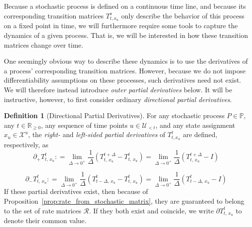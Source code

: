 \documentclass[10pt,a4paper]{paper}
\theoremstyle{definition}
\newtheorem{definition}{Definition}
\newcommand{\reals}{\mathbb{R}}
\newcommand{\realsnonneg}{\reals_{\geq 0}}
\newcommand{\states}{\mathcal{X}}
\newcommand{\processes}{\mathbb{P}}
\newcommand{\coloneqq}{:\!=}
\begin{document}
Because a stochastic process is defined on a continuous time line, and because its corresponding transition matrices $T_{t,x_u}^s$ only describe the behavior of this process on a fixed point in time, we will furthermore require some tools to capture the dynamics of a given process. That is, we will be interested in how these transition matrices change over time.

One seemingly obvious way to describe these dynamics is to use the derivatives of a process' corresponding transition matrices. However, because we do not impose differentiability assumptions on these processes, such derivatives need not exist. We will therefore instead introduce \emph{outer partial derivatives} below. It will be instructive, however, to first consider ordinary \emph{directional partial derivatives}.


\begin{definition}[Directional Partial Derivatives]\label{def:direc_partial_deriv}
For any stochastic process $P\in\processes$, any $t\in\realsnonneg$, any sequence of time points $u\in\mathcal{U}_{<t}$, and any state assignment $x_u\in\states^u$, the \emph{right-} and \emph{left-sided partial derivatives} of $T_{t,x_u}^t$ are defined, respectively, as
\begin{equation*}
\partial_{+}{T_{t,\,x_u}^t}
\coloneqq
\lim_{\Delta\to 0^{+}}
\frac{1}{\Delta}
(T^{t+\Delta}_{t,\,x_u}-T^t_{t,\,x_u})
=
\lim_{\Delta\to 0^{+}}
\frac{1}{\Delta}
(T^{t+\Delta}_{t,\,x_u}-I)
\end{equation*}

\begin{equation*}
\partial_{-}{T_{t,\,x_u}^t}
\coloneqq
\lim_{\Delta\to 0^{+}}
\frac{1}{\Delta}
(T^{t}_{t-\Delta,\,x_u}-T^t_{t,\,x_u})
=
\lim_{\Delta\to 0^{+}}
\frac{1}{\Delta}
(T^{t}_{t-\Delta,\,x_u}-I)
\end{equation*}
\noindent If these partial derivatives exist, then because of Proposition~\ref{prop:rate_from_stochastic_matrix}, they are guaranteed to belong to the set of rate matrices  $\mathcal{R}$. If they both exist and coincide, we write $\partial{T_{t,\,x_u}^t}$ to denote their common value.
\end{definition}
\end{document}
